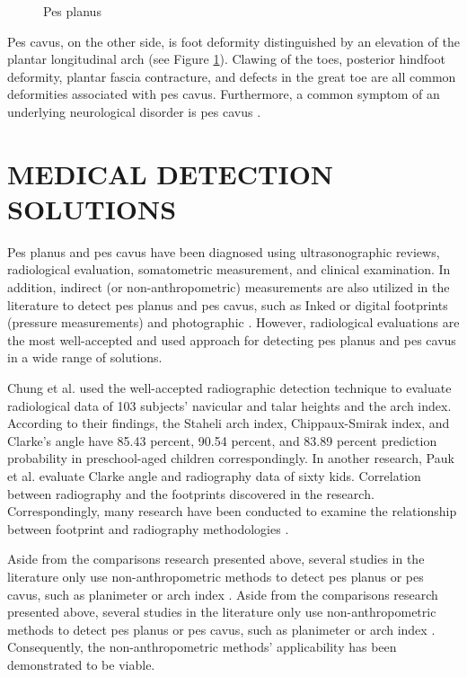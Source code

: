 \begin{figure}[htbp]
\centering
{}
\caption{Pes planus \cite{physiopediapescavus}}
\label{fig:BackgroundPesCavus}
\end{figure}

Pes cavus,  on the other side, is foot deformity distinguished by an elevation of the plantar longitudinal arch (see Figure \ref{fig:BackgroundPesCavus}). Clawing of the toes, posterior hindfoot deformity, plantar fascia contracture, and defects in the great toe are all common deformities associated with pes cavus. Furthermore, a common symptom of an underlying neurological disorder is pes cavus \cite{Brewerton1963IDIOPATHICPC}.

\section{MEDICAL DETECTION SOLUTIONS}

Pes planus and pes cavus have been diagnosed using ultrasonographic reviews, radiological evaluation, somatometric measurement, and clinical examination. In addition, indirect (or non-anthropometric) measurements are also utilized in the literature to detect pes planus and pes cavus, such as Inked or digital footprints (pressure measurements) and photographic \cite{gun2012pes, yalccin2010medial}. However, radiological evaluations \cite{Smith1997PrevalenceOR, Winfeld2019ManagementOP} are the most well-accepted and used approach for detecting pes planus and pes cavus in a wide range of solutions.

Chung et al. \cite{Chen2010FootprintAO} used the well-accepted radiographic detection technique to evaluate radiological data of 103 subjects' navicular and talar heights and the arch index. According to their findings, the Staheli arch index, Chippaux-Smirak index, and Clarke's angle have 85.43 percent, 90.54 percent, and 83.89 percent prediction probability in preschool-aged children correspondingly. In another research, Pauk et al. \cite{Pauk2014AssessingPP} evaluate Clarke angle and radiography data of sixty kids. Correlation between radiography and the footprints discovered in the research. Correspondingly, many research have been conducted to examine the relationship between footprint and radiography methodologies \cite{Kanatl2001FootprintAR, Yaln2010EvaluationOT, menz2005validity}.

Aside from the comparisons research presented above, several studies in the literature only use non-anthropometric methods to detect pes planus or pes cavus, such as planimeter \cite{Didia1987TheUO} or arch index \cite{Cavanagh1987TheAI, Igbigbi2002TheFR}. Aside from the comparisons research presented above, several studies in the literature only use non-anthropometric methods to detect pes planus or pes cavus, such as planimeter \cite{Didia1987TheUO} or arch index \cite{Cavanagh1987TheAI, Igbigbi2002TheFR}. Consequently, the non-anthropometric methods' applicability has been demonstrated to be viable.

